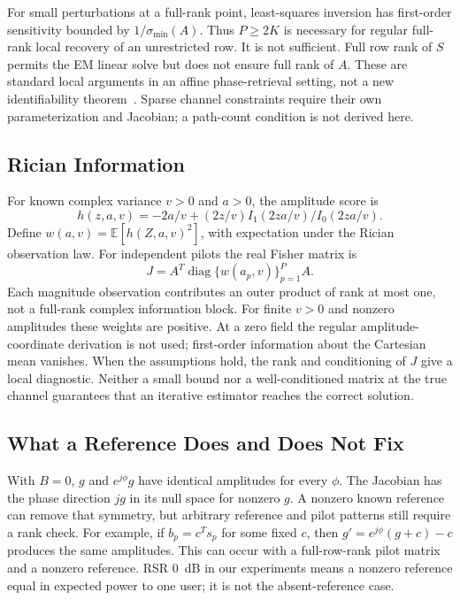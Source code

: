 \documentclass[journal]{IEEEtran}
\DeclareMathOperator{\diag}{diag}
\begin{document}
For small perturbations at a full-rank point, least-squares inversion has
first-order sensitivity bounded by $1/\sigma_{\min}(A)$.
Thus $P\ge2K$ is necessary for regular full-rank local recovery of an
unrestricted row. It is not sufficient. Full row rank of $S$ permits
the EM linear solve but does not ensure full rank of $A$. These are
standard local arguments in an affine phase-retrieval setting, not a new
identifiability theorem~\cite{gao2018}. Sparse channel constraints require their own
parameterization and Jacobian; a path-count condition is not derived here.

\subsection{Rician Information}
For known complex variance $v>0$ and $a>0$, the amplitude score is
\begin{equation}
 h(z,a,v)=-2a/v+(2z/v)I_1(2za/v)/I_0(2za/v).
\end{equation}
Define $w(a,v)=\mathbb E[h(Z,a,v)^2]$, with expectation under the
Rician observation law. For independent pilots the real Fisher matrix is
\begin{equation}
 J=A^T\diag\{w(a_p,v)\}_{p=1}^P A.
\end{equation}
Each magnitude observation contributes an outer product of rank at most one, not a
full-rank complex information block. For finite $v>0$ and nonzero
amplitudes these weights are positive. At a zero field the regular
amplitude-coordinate derivation is not used; first-order information
about the Cartesian mean vanishes. When the assumptions hold, the
rank and conditioning of $J$ give a local diagnostic. Neither a small
bound nor a well-conditioned matrix at the true channel guarantees that
an iterative estimator reaches the correct solution.

\subsection{What a Reference Does and Does Not Fix}
With $B=0$, $g$ and $e^{j\phi}g$ have identical amplitudes for every
$\phi$. The Jacobian has the phase direction $jg$ in its null space for
nonzero $g$. A nonzero known reference can remove that symmetry, but
arbitrary reference and pilot patterns still require a rank check. For
example, if $b_p=c^Ts_p$ for some fixed $c$, then
$g'=e^{j\phi}(g+c)-c$ produces the same amplitudes. This can occur
with a full-row-rank pilot matrix and a nonzero reference.
RSR $0$~dB in our experiments means a nonzero reference equal in expected
power to one user; it is not the absent-reference case.
\end{document}
